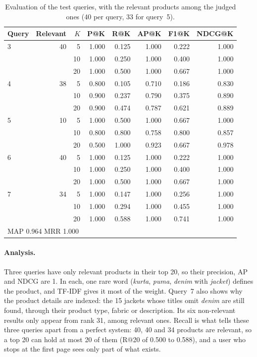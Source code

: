 \documentclass[11pt,a4paper]{article}
\begin{document}
\begin{table}[htbp]
  \centering
  \caption{Evaluation of the test queries, with the relevant products among the
  judged ones (40 per query, 33 for query~5).}
  \label{tab:test}
  \begin{tabular}{lrrrrrrr}
    \toprule
    Query & Relevant & $K$ & P@K & R@K & AP@K & F1@K & NDCG@K \\
    \midrule
    3 & 40 & 5  & 1.000 & 0.125 & 1.000 & 0.222 & 1.000 \\
      &    & 10 & 1.000 & 0.250 & 1.000 & 0.400 & 1.000 \\
      &    & 20 & 1.000 & 0.500 & 1.000 & 0.667 & 1.000 \\
    \midrule
    4 & 38 & 5  & 0.800 & 0.105 & 0.710 & 0.186 & 0.830 \\
      &    & 10 & 0.900 & 0.237 & 0.790 & 0.375 & 0.890 \\
      &    & 20 & 0.900 & 0.474 & 0.787 & 0.621 & 0.889 \\
    \midrule
    5 & 10 & 5  & 1.000 & 0.500 & 1.000 & 0.667 & 1.000 \\
      &    & 10 & 0.800 & 0.800 & 0.758 & 0.800 & 0.857 \\
      &    & 20 & 0.500 & 1.000 & 0.923 & 0.667 & 0.978 \\
    \midrule
    6 & 40 & 5  & 1.000 & 0.125 & 1.000 & 0.222 & 1.000 \\
      &    & 10 & 1.000 & 0.250 & 1.000 & 0.400 & 1.000 \\
      &    & 20 & 1.000 & 0.500 & 1.000 & 0.667 & 1.000 \\
    \midrule
    7 & 34 & 5  & 1.000 & 0.147 & 1.000 & 0.256 & 1.000 \\
      &    & 10 & 1.000 & 0.294 & 1.000 & 0.455 & 1.000 \\
      &    & 20 & 1.000 & 0.588 & 1.000 & 0.741 & 1.000 \\
    \midrule
    \multicolumn{8}{l}{MAP 0.964 \qquad MRR 1.000} \\
    \bottomrule
  \end{tabular}
\end{table}

\paragraph{Analysis.} Three queries have only relevant products in their top
20, so their precision, AP and NDCG are 1. In each, one rare word
(\emph{kurta}, \emph{puma}, \emph{denim} with \emph{jacket}) defines the
product, and TF-IDF gives it most of the weight. Query~7 also shows why the
product details are indexed: the 15 jackets whose titles omit \emph{denim}
are still found, through their product type, fabric or description. Its six non-relevant
results only appear from rank 31, among relevant ones. Recall is what tells
these three queries apart from a perfect system: 40, 40 and 34 products are
relevant, so a top 20 can hold at most 20 of them (R@20 of 0.500 to
0.588), and a user who stops at the first page sees only part of what exists.
\end{document}
